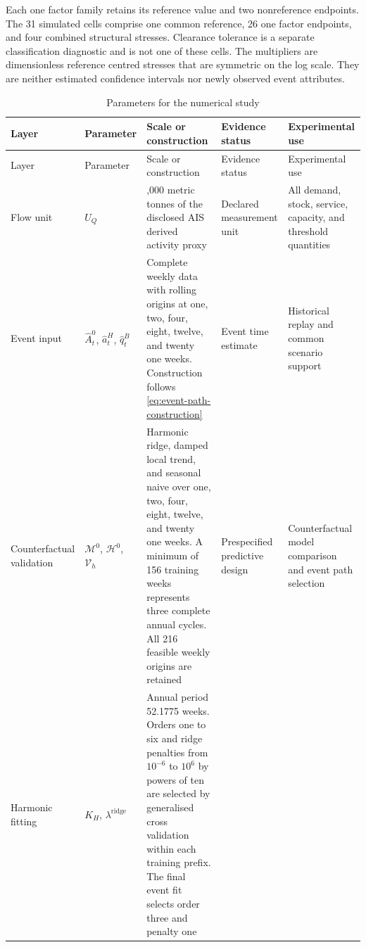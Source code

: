 \documentclass[a4paper,fleqn]{cas-sc}
\begin{document}
Each one factor family retains its reference value and two nonreference
endpoints. The 31 simulated cells comprise one common reference, 26 one factor
endpoints, and four combined structural stresses. Clearance tolerance is a
separate classification diagnostic and is not one of these cells. The
multipliers are dimensionless reference centred stresses that are symmetric on
the log scale. They are neither estimated confidence intervals nor newly
observed event attributes.

\begingroup
\small
\setlength{\tabcolsep}{3.5pt}
\begin{longtable}{>{\RaggedRight\arraybackslash}p{}
                  >{\RaggedRight\arraybackslash}p{}
                  >{\RaggedRight\arraybackslash}p{}
                  >{\RaggedRight\arraybackslash}p{}
                  >{\RaggedRight\arraybackslash}p{}}
\caption{Parameters for the numerical study}\label{tab:parameter-register-84}\\
\toprule
Layer & Parameter & Scale or construction & Evidence status & Experimental use \\
\midrule
\endfirsthead
\toprule
Layer & Parameter & Scale or construction & Evidence status & Experimental use \\
\midrule
\endhead
Flow unit
& $U_Q$
& 1,000 metric tonnes of the disclosed AIS derived activity proxy
& Declared measurement unit
& All demand, stock, service, capacity, and threshold quantities \\
Event input
& $\widehat A_t^0$, $\widehat a_t^H$, $\widehat q_t^B$
& Complete weekly data with rolling origins at one, two, four, eight, twelve, and twenty one weeks. Construction follows \cref{eq:event-path-construction}
& Event time estimate
& Historical replay and common scenario support \\
Counterfactual validation
& $\mathcal M^0$, $\mathcal H^0$, $\mathcal V_h$
& Harmonic ridge, damped local trend, and seasonal naive over one, two, four, eight, twelve, and twenty one weeks. A minimum of 156 training weeks represents three complete annual cycles. All 216 feasible weekly origins are retained
& Prespecified predictive design
& Counterfactual model comparison and event path selection \\
Harmonic fitting
& $K_H$, $\lambda^{\mathrm{ridge}}$
& Annual period 52.1775 weeks. Orders one to six and ridge penalties from $10^{-6}$ to $10^6$ by powers of ten are selected by generalised cross validation within each training prefix. The final event fit selects order three and penalty one

\end{longtable}
\end{document}
